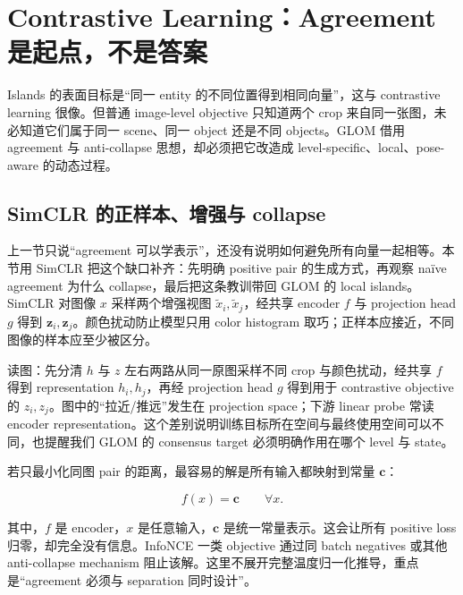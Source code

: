 \section{Contrastive Learning：Agreement 是起点，不是答案}

Islands 的表面目标是“同一 entity 的不同位置得到相同向量”，这与 contrastive learning 很像。但普通 image-level objective 只知道两个 crop 来自同一张图，未必知道它们属于同一 scene、同一 object 还是不同 objects。GLOM 借用 agreement 与 anti-collapse 思想，却必须把它改造成 level-specific、local、pose-aware 的动态过程。


\subsection{SimCLR 的正样本、增强与 collapse}

上一节只说“agreement 可以学表示”，还没有说明如何避免所有向量一起相等。本节用 SimCLR 把这个缺口补齐：先明确 positive pair 的生成方式，再观察 naïve agreement 为什么 collapse，最后把这条教训带回 GLOM 的 local islands。SimCLR 对图像 $x$ 采样两个增强视图 $\tilde x_i,\tilde x_j$，经共享 encoder $f$ 与 projection head $g$ 得到 $\mathbf z_i,\mathbf z_j$。颜色扰动防止模型只用 color histogram 取巧；正样本应接近，不同图像的样本应至少被区分。


\begin{knowledgebox}{读图：先分清 $h$ 与 $z$}
左右两路从同一原图采样不同 crop 与颜色扰动，经共享 $f$ 得到 representation $h_i,h_j$，再经 projection head $g$ 得到用于 contrastive objective 的 $z_i,z_j$。图中的“拉近/推远”发生在 projection space；下游 linear probe 常读 encoder representation。这个差别说明训练目标所在空间与最终使用空间可以不同，也提醒我们 GLOM 的 consensus target 必须明确作用在哪个 level 与 state。
\end{knowledgebox}

若只最小化同图 pair 的距离，最容易的解是所有输入都映射到常量 $\mathbf c$：

\[
f(x)=\mathbf c\qquad \forall x.
\]

其中，$f$ 是 encoder，$x$ 是任意输入，$\mathbf c$ 是统一常量表示。这会让所有 positive loss 归零，却完全没有信息。InfoNCE 一类 objective 通过同 batch negatives 或其他 anti-collapse mechanism 阻止该解。这里不展开完整温度归一化推导，重点是“agreement 必须与 separation 同时设计”。

